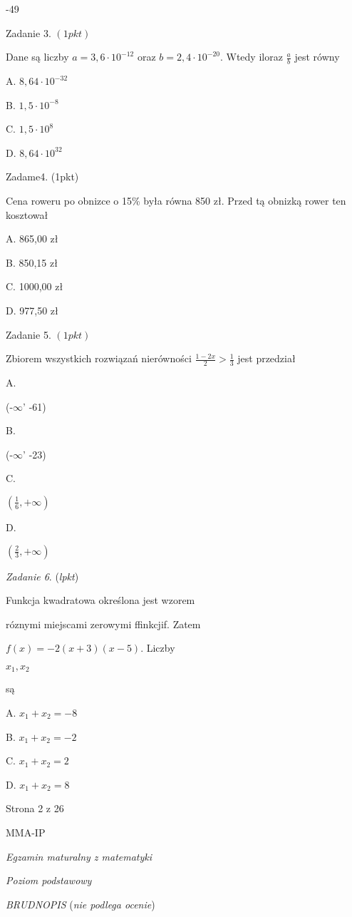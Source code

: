 \documentclass[a4paper,12pt]{article}
\begin{document}
-49

Zadanie 3. $(1pkt)$

Dane są liczby $a=3,6\cdot 10^{-12}$ oraz $b=2,4\cdot 10^{-20}$. Wtedy iloraz $\displaystyle \frac{a}{b}$ jest równy

A. $8,64\cdot 10^{-32}$

B. $1,5\cdot 10^{-8}$

C. $1,5\cdot 10^{8}$

D. $8,64\cdot 10^{32}$

Zadame4. (1pkt)

Cena roweru po obnizce o 15\% była równa 850 zł. Przed tą obnizką rower ten kosztował

A. 865,00 zł

B. 850,15 zł

C. 1000,00 zł

D. 977,50 zł

Zadanie 5. $(1pkt)$

Zbiorem wszystkich rozwiązań nierówności $\displaystyle \frac{1-2x}{2}>\frac{1}{3}$ jest przedział

A.

(-$\infty$' -61)

B.

(-$\infty$' -23)

C.

$(\displaystyle \frac{1}{6},+\infty)$

D.

$(\displaystyle \frac{2}{3},+\infty)$

{\it Zadanie 6}. ({\it lpkt})

Funkcja kwadratowa określona jest wzorem

róznymi miejscami zerowymi ffinkcjif. Zatem

$f(x)=-2(x+3)(x-5)$. Liczby

$x_{1}, x_{2}$

są

A. $x_{1}+x_{2}=-8$

B. $x_{1}+x_{2}=-2$

C. $x_{1}+x_{2}=2$

D. $x_{1}+x_{2}=8$

Strona 2 z 26

MMA-IP





{\it Egzamin maturalny z matematyki}

{\it Poziom podstawowy}

{\it BRUDNOPIS} ({\it nie podlega ocenie})
\end{document}
